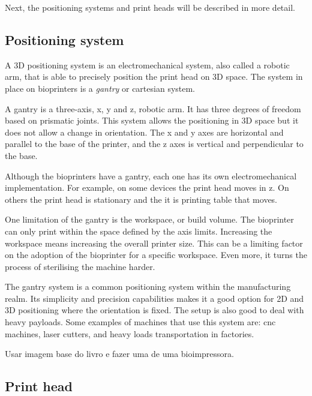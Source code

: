 Next, the positioning systems and print heads will be described in more detail.

\subsection{Positioning system}
\label{subsec:positioning_system}

A 3D positioning system is an electromechanical system, also called a robotic arm, that is able to precisely position the print head on 3D space. The system in place on bioprinters is a \emph{gantry} or cartesian system.

A gantry is a three-axis, x, y and z, robotic arm. It has three degrees of freedom based on prismatic joints. This system allows the positioning in 3D space but it does not allow a change in orientation. The x and y axes are horizontal and parallel to the base of the printer, and the z axes is vertical and perpendicular to the base.

Although the bioprinters have a gantry, each one has its own electromechanical implementation. For example, on some devices the print head moves in z. On others the print head is stationary and the it is printing table that moves.

One limitation of the gantry is the workspace, or build volume. The bioprinter can only print within the space defined by the axis limits. Increasing the workspace means increasing the overall printer size. This can be a limiting factor on the adoption of the bioprinter for a specific workspace. Even more, it turns the process of sterilising the machine harder. 

The gantry system is a common positioning system within the manufacturing realm. Its simplicity and precision capabilities makes it a good option for 2D and 3D positioning where the orientation is fixed. The setup is also good to deal with heavy payloads. Some examples of machines that use this system are: \gls{cnc} machines, laser cutters, and heavy loads transportation in factories.

{\color{red}Usar imagem base do livro e fazer uma de uma bioimpressora.} 


\subsection{Print head}
\label{subsec:print_head}

